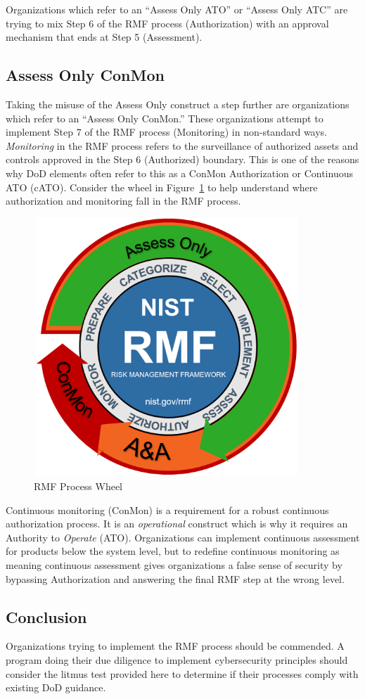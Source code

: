 Organizations which refer to an ``Assess Only ATO'' or ``Assess Only ATC'' are trying to mix Step 6 of the RMF process (Authorization) with an approval mechanism that ends at Step 5 (Assessment).

\subsection{Assess Only ConMon}
Taking the misuse of the Assess Only construct a step further are organizations which refer to an ``Assess Only ConMon.'' These organizations attempt to implement Step 7 of the RMF process (Monitoring) in non-standard ways. \textit{Monitoring} in the RMF process refers to the surveillance of authorized assets and controls approved in the Step 6 (Authorized) boundary.\autocite{20240212:nist80037rev2} This is one of the reasons why DoD elements often refer to this as a ConMon Authorization or Continuous ATO (cATO). Consider the wheel in Figure~\ref{fig:20240212:rmfwheel} to help understand where authorization and monitoring fall in the RMF process.

\begin{figure}[h]
\centering
\includegraphics[width=10cm, height=9.73cm]{20240212.rmfwheel.png}
\caption{RMF Process Wheel}
\label{fig:20240212:rmfwheel}
\end{figure}

Continuous monitoring (ConMon) is a requirement for a robust continuous authorization process. It is an \textit{operational} construct which is why it requires an Authority to \textit{Operate} (ATO). Organizations can implement continuous assessment for products below the system level, but to redefine continuous monitoring as meaning continuous assessment gives organizations a false sense of security by bypassing Authorization and answering the final RMF step at the wrong level.

\subsection{Conclusion}
Organizations trying to implement the RMF process should be commended. A program doing their due diligence to implement cybersecurity principles should consider the litmus test provided here to determine if their processes comply with existing DoD guidance.
